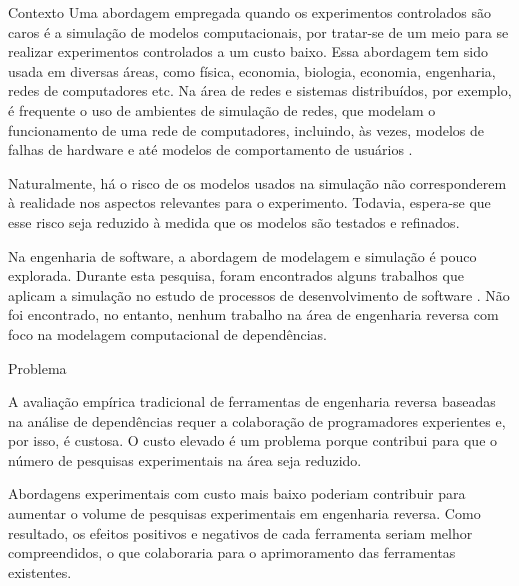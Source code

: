\begin{section}{Contexto}
		Uma abordagem empregada quando os experimentos controlados são caros é a simulação de modelos computacionais, por tratar-se de um meio para se realizar experimentos controlados a um custo baixo. Essa abordagem tem sido usada em diversas áreas, como física, economia, biologia, economia, engenharia, redes de computadores etc. Na área de redes e sistemas distribuídos, por exemplo, é frequente o uso de ambientes de simulação de redes, que modelam o funcionamento de uma rede de computadores, incluindo, às vezes, modelos de falhas de hardware e até modelos de comportamento de usuários \cite{White2002}. 
		
		Naturalmente, há o risco de os modelos usados na simulação não corresponderem à realidade nos aspectos relevantes para o experimento. Todavia, espera-se que esse risco seja reduzido à medida que os modelos são testados e refinados.

		Na engenharia de software, a abordagem de modelagem e simulação é pouco explorada. Durante esta pesquisa, foram encontrados alguns trabalhos que aplicam a simulação no estudo de processos de desenvolvimento de software \cite{Stopford2008}. Não foi encontrado, no entanto, nenhum trabalho na área de engenharia reversa com foco na modelagem computacional de dependências.
		
\end{section}

\begin{section}{Problema}
	
	A avaliação empírica tradicional de ferramentas de engenharia reversa baseadas na análise de dependências requer a colaboração de programadores experientes e, por isso, é custosa. O custo elevado é um problema porque contribui para que o número de pesquisas experimentais na área seja reduzido. 
	
  Abordagens experimentais com custo mais baixo poderiam contribuir para aumentar o volume de pesquisas experimentais em engenharia reversa. Como resultado, os efeitos positivos e negativos de cada ferramenta seriam melhor compreendidos, o que colaboraria para o aprimoramento das ferramentas existentes.
	
	
\end{section}

